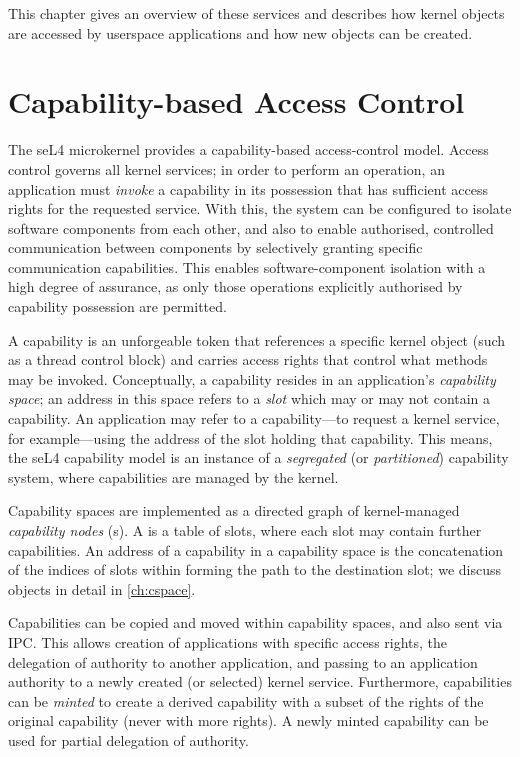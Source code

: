 This chapter gives an overview of these services and describes how kernel
objects are accessed by userspace applications and how new
objects can be created.

\section{Capability-based Access Control}
\label{sec:cap-access-control}

The seL4 microkernel provides a capability-based access-control model.
Access control governs all kernel services; in order to perform an
operation, an application must \emph{invoke} a capability in its
possession that has sufficient access rights for the requested service.
With this, the system can be configured to isolate software components from
each other, and also to enable authorised, controlled communication
between components by selectively granting specific communication
capabilities.  This enables software-component isolation with a high
degree of assurance, as only those operations explicitly authorised by
capability possession are permitted.

A capability is an unforgeable token that references a specific kernel
object (such as a thread control block) and carries access rights that
control what methods may be invoked.
Conceptually, a capability resides in an application's \emph{capability
space}; an address in this space refers to a \emph{slot} which may or
may not contain a capability.  An application may refer to
a capability---to request a kernel service, for example---using the
address of the slot holding that capability.  This means, the seL4
capability model is an instance of a \emph{segregated} (or \emph{partitioned})
capability system, where capabilities are managed by the kernel.

Capability spaces are implemented as a directed graph of kernel-managed
\emph{capability nodes} (s).  A  is a table of
slots, where each slot may contain further  capabilities. An
address of a capability in a capability space is the concatenation of the indices
of slots within  forming the path to the destination
slot; we discuss  objects in detail in \autoref{ch:cspace}.

Capabilities can be copied and moved within capability spaces, and
also sent via IPC. This allows creation of applications with specific
access rights, the delegation of authority to another application, and
passing to an application authority to a newly created (or selected)
kernel service. Furthermore, capabilities can be \emph{minted} to
create a derived capability with a subset of the rights of the
original capability (never with more rights). A newly minted
capability can be used for partial delegation of authority.

